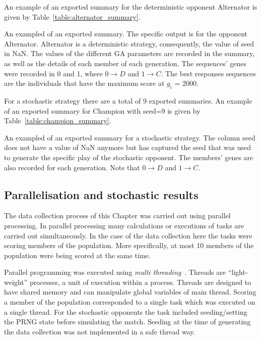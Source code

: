 An example of an exported summary for the deterministic opponent Alternator
is given by Table~\ref{table:alternator_summary}.

\begin{table}[!htbp]
    \resizebox{\textwidth}{!}{
    }
    \caption{An exampled of an exported summary. The specific output is for
    the opponent Alternator. Alternator is a deterministic strategy,
    consequently, the value of seed in NaN. The values of the different GA
    parameters are recorded in the summary, as well as the details of each
    member of each generation. The sequences' genes
    were recorded in 0 and 1, where \(0 \to D\) and \(1 \to C\).
    The best responses sequences are the individuals
    that have the maximum score at \(g_i\) = 2000.}\label{table:alternator_summary}
\end{table}

For a stochastic strategy there are a total of 9 exported summaries. An example
of an exported summary for Champion with seed=9 is given by
Table~\ref{table:champion_summary}.

\begin{table}[!htbp]
    \resizebox{\textwidth}{!}{
    }
    \caption{An exampled of an exported summary for a stochastic strategy. The
    column seed does not have a value of NaN anymore but has captured the seed that
    was used to generate the specific play of the stochastic opponent. The members'
    genes are also recorded for each generation. Note that \(0 \to D\) and
    \(1 \to C\).}\label{table:champion_summary}
\end{table}

\subsection{Parallelisation and stochastic results}

The data collection process of this Chapter was carried out using parallel
processing. In parallel processing many calculations or executions of tasks
are carried out simultaneously. In the case of the data collection here the
tasks were scoring members of the population. More specifically, at most 10
members of the population were being scored at the same time.

Parallel programming was executed using \textit{multi
threading}~\cite{Shameem2005}. Threads are “light-weight” processes, a unit of
execution within a process. Threads are designed to have shared memory and can
manipulate global variables of main thread. Scoring a member of the population
corresponded to a single task which was executed on a single thread. For the
stochastic opponents the task included seeding/setting the PRNG state before
simulating the match. Seeding at the time of generating the data
collection was not implemented in a safe thread way.

